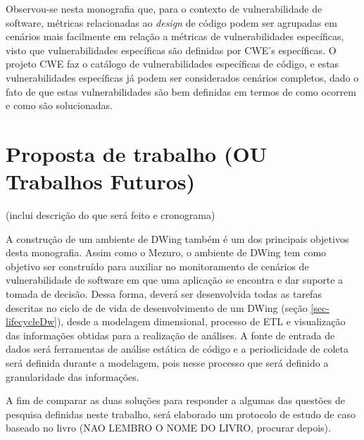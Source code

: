 %

Observou-se nesta monografia que, para o contexto de vulnerabilidade de software, métricas relacionadas ao \emph{design} de código podem ser agrupadas em cenários mais facilmente em relação a métricas de vulnerabilidades específicas, visto que vulnerabilidades específicas são definidas por CWE's específicas. O projeto CWE faz o catálogo de vulnerabilidades específicas de código, e estas vulnerabilidades específicas já podem ser considerados cenários completos, dado o fato de que estas vulnerabilidades são bem definidas em termos de como ocorrem e como são solucionadas.   






\section{Proposta de trabalho (OU Trabalhos Futuros)}

(inclui descrição do que será feito e cronograma)


%

A construção de um ambiente de DWing também é um dos principais objetivos desta monografia. Assim como o Mezuro, o ambiente de DWing tem como objetivo ser construído para auxiliar no monitoramento de cenários de vulnerabilidade de software em que uma aplicação se encontra e dar suporte a tomada de decisão. Dessa forma, deverá ser desenvolvida todas as tarefas descritas no ciclo de de vida de desenvolvimento de um DWing (seção \ref{sec-lifecycleDw}), desde a modelagem dimensional, processo de ETL e visualização das informações obtidas para a realização de análises. A fonte de entrada de dados será ferramentas de análise estática de código e a periodicidade de coleta será definida durante a modelagem, pois nesse processo que será definido a granularidade das informações.

%

A fim de comparar as duas soluções para responder a algumas das questões de pesquisa definidas neste trabalho, será elaborado um protocolo de estudo de caso baseado no livro (NAO LEMBRO O NOME DO LIVRO, procurar depois). 

